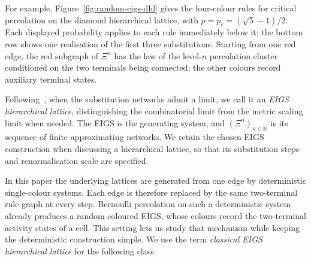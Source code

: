 \documentclass[scheme=plain,11pt]{ctexart}
\theoremstyle{definition}
\theoremstyle{remark}
\begin{document}
For example, Figure~\ref{fig:random-eigs-dhl} gives the four-colour rules for critical percolation on the diamond hierarchical lattice, with $p=p_c=(\sqrt5-1)/2$.
Each displayed probability applies to each rule immediately below it; the bottom row shows one realisation of the first three substitutions.
Starting from one red edge, the red subgraph of $\Xi^n$ has the law of the level-$n$ percolation cluster conditioned on the two terminals being connected; the other colours record auxiliary terminal states.

Following~\cite{neroli2026iterated}, when the substitution networks admit a limit, we call it an \emph{EIGS hierarchical lattice}, distinguishing the combinatorial limit from the metric scaling limit when needed.
The EIGS is the generating system, and $(\Xi^n)_{n\in\mathbb N}$ is its sequence of finite approximating networks.
We retain the chosen EIGS construction when discussing a hierarchical lattice, so that its substitution steps and renormalisation scale are specified.

In this paper the underlying lattices are generated from one edge by deterministic single-colour systems.
Each edge is therefore replaced by the same two-terminal rule graph at every step.
Bernoulli percolation on such a deterministic system already produces a random coloured EIGS, whose colours record the two-terminal activity states of a cell.
This setting lets us study that mechanism while keeping the deterministic construction simple.
We use the term \emph{classical EIGS hierarchical lattice} for the following class.
\end{document}
